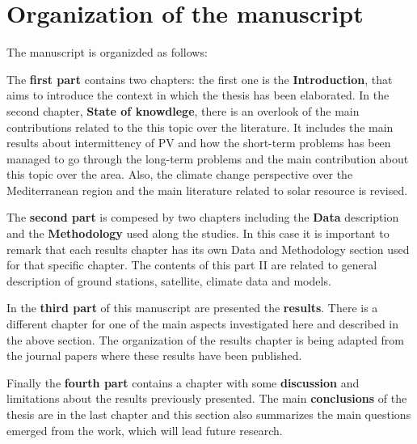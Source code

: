 \section{Organization of the manuscript}%

The manuscript is organizded as follows:

The \textbf{first part} contains two chapters: the first one is the \textbf{Introduction}, that aims to introduce the context in which the thesis has been elaborated. In the second chapter, \textbf{State of knowdlege}, there is an overlook of the main contributions related to the this topic over the literature. It includes the main results about intermittency of PV and how the short-term problems has been managed to go through the long-term problems and the main contribution about this topic over the area. Also, the climate change perspective over the Mediterranean region and the main literature related to solar resource is revised.

The \textbf{second part} is compesed by two chapters including the \textbf{Data} description and the \textbf{Methodology} used along the studies. In this case it is important to remark that each results chapter has its own Data and Methodology section used for that specific chapter. The contents of this part II are related to general description of ground stations, satellite, climate data and models.

In the \textbf{third part} of this manuscript are presented the \textbf{results}. There is a different chapter for one of the main aspects investigated here and described in the above section. The organization of the results chapter is being adapted from the journal papers where these results have been published.

Finally the \textbf{fourth part} contains a chapter with some \textbf{discussion} and limitations about the results previously presented. The main \textbf{conclusions} of the thesis are in the last chapter and this section also summarizes the main questions emerged from the work, which will lead future research.


